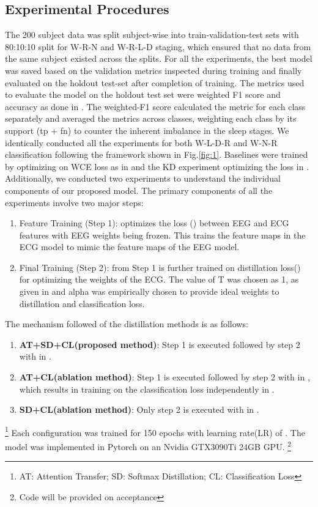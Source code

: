 \documentclass[letterpaper, 10 pt, conference]{ieeeconf}
\begin{document}
\subsection{Experimental Procedures}
The 200 subject data was split subject-wise into train-validation-test sets with 80:10:10 split for W-R-N and W-R-L-D staging, which ensured that no data from the same subject existed across the splits. For all the experiments, the best model was saved based on the validation metrics inspected during training and finally evaluated on the holdout test-set after completion of training. The metrics used to evaluate the model on the holdout test set were weighted F1 score and accuracy as done in \cite{perslev2019u}. The weighted-F1 score calculated the metric for each class separately and averaged the metrics across classes, weighting each class by its support (tp + fn) to counter the inherent imbalance in the sleep stages. We identically conducted all the experiments for both W-L-D-R and W-N-R classification following the framework shown in Fig.\ref{fig:1}. Baselines were trained by optimizing on WCE loss as in  and the KD experiment optimizing the loss in . Additionally, we conducted two experiments to understand the individual components of our proposed model. The primary components of all the experiments involve two major steps:
\begin{enumerate}
    \item Feature Training (Step 1):  optimizes the loss () between EEG and ECG features with EEG weights being frozen. This trains the feature maps in the ECG model to mimic the feature maps of the EEG model.
    \item Final Training (Step 2):  from Step 1 is further trained on distillation loss() for optimizing the weights of the ECG. The value of T was chosen as 1, as given in \cite{hinton2015distilling} and alpha was empirically chosen to provide ideal weights to distillation and classification loss.
\end{enumerate}
The mechanism followed of the distillation methods is as follows:

\begin{enumerate}
    \item \textbf{AT+SD+CL(proposed method)}: Step 1 is executed followed by step 2 with  in .
    \item \textbf{AT+CL(ablation method)}: Step 1 is executed followed by step 2 with  in , which results in training on the classification loss independently in .
    \item \textbf{SD+CL(ablation method)}: Only step 2 is executed with  in .
\end{enumerate}
\footnote{AT: Attention Transfer; SD: Softmax Distillation; CL: Classification Loss}
Each configuration was trained for 150 epochs with learning  rate(LR) of . The model was implemented in Pytorch on an Nvidia GTX3090Ti 24GB GPU. 
\footnote{Code will be provided on acceptance}
\end{document}
